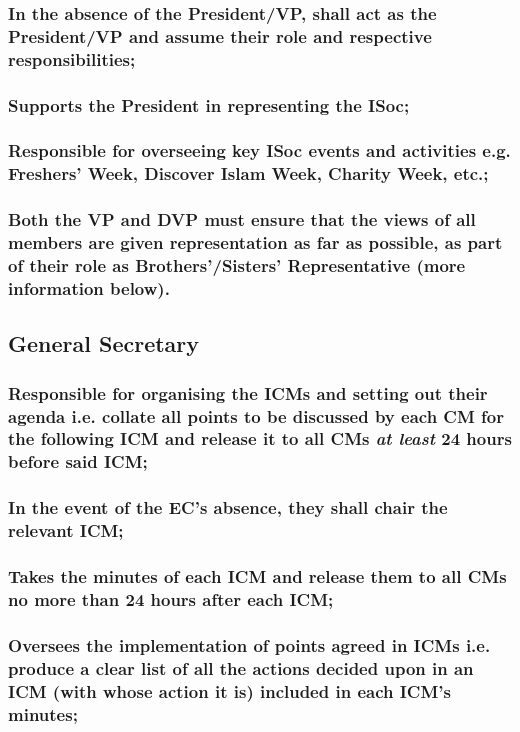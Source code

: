 \documentclass[12pt]{article}
\begin{document}
\subsubsection{In the absence of the President/VP, shall act as the President/VP and assume their role and respective responsibilities;}
\subsubsection{Supports the President in representing the ISoc;}
\subsubsection{Responsible for overseeing key ISoc events and activities e.g. Freshers' Week, Discover Islam Week, Charity Week, etc.;}
\subsubsection{Both the VP and DVP must ensure that the views of all members are given representation as far as possible, as part of their role as Brothers'/Sisters' Representative (more information below).}
\hspace{1pt}

\subsection{General Secretary}
\subsubsection{Responsible for organising the ICMs and setting out their agenda i.e. collate all points to be discussed by each CM for the following ICM and release it to all CMs \emph{at least} 24 hours before said ICM;}
\subsubsection{In the event of the EC's absence, they shall chair the relevant ICM;}
\subsubsection{Takes the minutes of each ICM and release them to all CMs no more than 24 hours after each ICM;}
\subsubsection{Oversees the implementation of points agreed in ICMs i.e. produce a clear list of all the actions decided upon in an ICM (with whose action it is) included in each ICM's minutes;}
\end{document}
